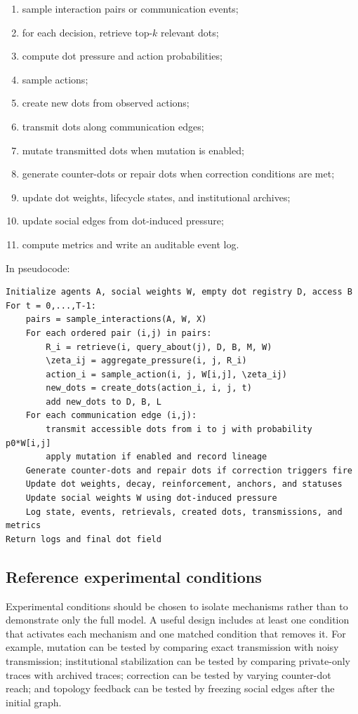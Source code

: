 \documentclass[11pt]{article}
\theoremstyle{remark}
\begin{document}
\begin{enumerate}[leftmargin=*]
\item sample interaction pairs or communication events;
\item for each decision, retrieve top-$k$ relevant dots;
\item compute dot pressure and action probabilities;
\item sample actions;
\item create new dots from observed actions;
\item transmit dots along communication edges;
\item mutate transmitted dots when mutation is enabled;
\item generate counter-dots or repair dots when correction conditions are met;
\item update dot weights, lifecycle states, and institutional archives;
\item update social edges from dot-induced pressure;
\item compute metrics and write an auditable event log.
\end{enumerate}

In pseudocode:

\begin{verbatim}
Initialize agents A, social weights W, empty dot registry D, access B
For t = 0,...,T-1:
    pairs = sample_interactions(A, W, X)
    For each ordered pair (i,j) in pairs:
        R_i = retrieve(i, query_about(j), D, B, M, W)
        \zeta_ij = aggregate_pressure(i, j, R_i)
        action_i = sample_action(i, j, W[i,j], \zeta_ij)
        new_dots = create_dots(action_i, i, j, t)
        add new_dots to D, B, L
    For each communication edge (i,j):
        transmit accessible dots from i to j with probability p0*W[i,j]
        apply mutation if enabled and record lineage
    Generate counter-dots and repair dots if correction triggers fire
    Update dot weights, decay, reinforcement, anchors, and statuses
    Update social weights W using dot-induced pressure
    Log state, events, retrievals, created dots, transmissions, and metrics
Return logs and final dot field
\end{verbatim}

\subsection{Reference experimental conditions}\label{reference-experimental-conditions}

Experimental conditions should be chosen to isolate mechanisms rather than to demonstrate only the full model. A useful design includes at least one condition that activates each mechanism and one matched condition that removes it. For example, mutation can be tested by comparing exact transmission with noisy transmission; institutional stabilization can be tested by comparing private-only traces with archived traces; correction can be tested by varying counter-dot reach; and topology feedback can be tested by freezing social edges after the initial graph.
\end{document}
